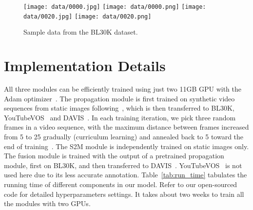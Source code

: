 \documentclass[final]{cvpr}
\begin{document}
	
	\begin{figure}[h]
		\vspace{-0.07in}
		\begin{center}
\texttt{[image: data/0000.jpg]}
			\texttt{[image: data/0000.png]}
			\texttt{[image: data/0020.jpg]}
			\texttt{[image: data/0020.png]}
		\end{center}
		\vspace{-0.15in}
		\caption{Sample data from the BL30K dataset.}
		\label{fig:bldata}
		\vspace{-0.22in}
	\end{figure}
	
	\section{Implementation Details}
	All three modules can be efficiently trained using just two 11GB GPU with the Adam optimizer~\cite{kingma2015adam}. The propagation module is first trained on synthetic video sequences from static images 
following~\cite{oh2019videoSTM}, which is then transferred to BL30K, YouTubeVOS~\cite{xu2018youtubeVOS} and DAVIS~\cite{Caelles_arXiv_2018}. In each training iteration, we pick three random frames in a video sequence, with the maximum distance between frames increased from 5 to 25 gradually (curriculum learning) and annealed back to 5 toward the end of training~\cite{zhangspatialWorkshop}. 
	The S2M module is independently trained on static images only. 
	The fusion module is trained with the output of a pretrained propagation module, first on BL30K, and then transferred to DAVIS~\cite{Caelles_arXiv_2018}. YouTubeVOS~\cite{xu2018youtubeVOS} is not used here due to its less accurate annotation. Table~\ref{tab:run_time} tabulates the running time of different components in our model. Refer to our open-sourced code for detailed hyperparameters settings.
	It takes about two weeks to train all the modules with two GPUs.
	
\end{document}
